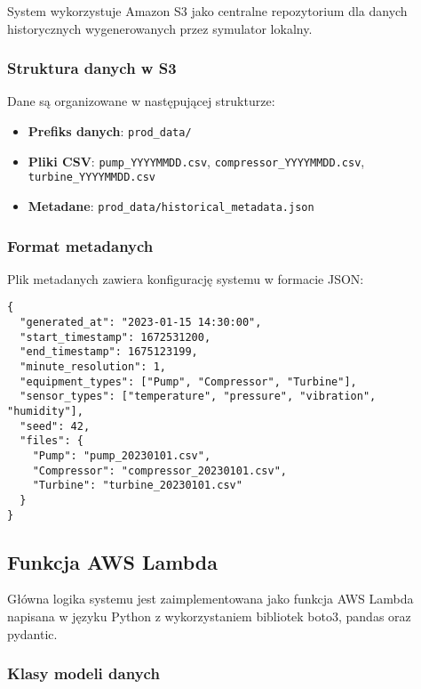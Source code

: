 System wykorzystuje Amazon S3 jako centralne repozytorium dla danych historycznych wygenerowanych przez symulator lokalny.

\subsubsection{Struktura danych w S3}

Dane są organizowane w następującej strukturze:

\begin{itemize}
    \item \textbf{Prefiks danych}: \texttt{prod\_data/}
    \item \textbf{Pliki CSV}: \texttt{pump\_YYYYMMDD.csv}, \texttt{compressor\_YYYYMMDD.csv}, \texttt{turbine\_YYYYMMDD.csv}
    \item \textbf{Metadane}: \texttt{prod\_data/historical\_metadata.json}
\end{itemize}

\subsubsection{Format metadanych}

Plik metadanych zawiera konfigurację systemu w formacie JSON:

\begin{verbatim}
{
  "generated_at": "2023-01-15 14:30:00",
  "start_timestamp": 1672531200,
  "end_timestamp": 1675123199,
  "minute_resolution": 1,
  "equipment_types": ["Pump", "Compressor", "Turbine"],
  "sensor_types": ["temperature", "pressure", "vibration", "humidity"],
  "seed": 42,
  "files": {
    "Pump": "pump_20230101.csv",
    "Compressor": "compressor_20230101.csv", 
    "Turbine": "turbine_20230101.csv"
  }
}
\end{verbatim}

\subsection{Funkcja AWS Lambda}
\label{subsec:aws_lambda}

Główna logika systemu jest zaimplementowana jako funkcja AWS Lambda napisana w języku Python z wykorzystaniem bibliotek boto3, pandas oraz pydantic.

\subsubsection{Klasy modeli danych}


